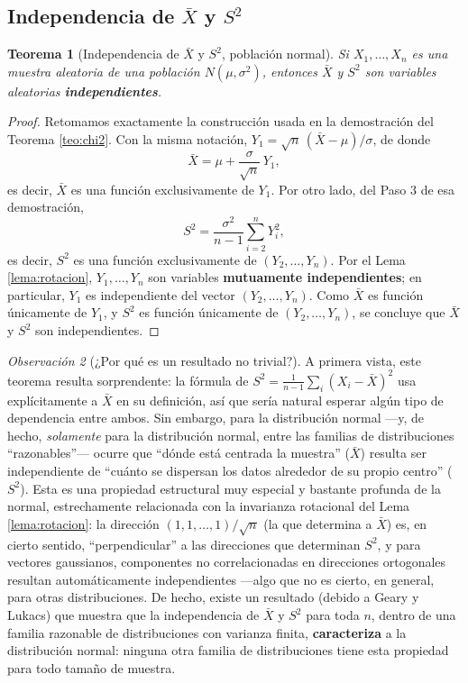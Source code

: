 \documentclass[11pt,a4paper]{article}
\theoremstyle{plain}
\newtheorem{teorema}{Teorema}[section]
\theoremstyle{definition}
\theoremstyle{remark}
\newtheorem{observacion}[teorema]{Observación}
\begin{document}
\subsection{Independencia de $\bar X$ y $S^2$}

\begin{teorema}[Independencia de $\bar X$ y $S^2$, población normal]
\label{teo:independencia}
Si $X_1,\dots,X_n$ es una muestra aleatoria de una población $N(\mu,\sigma^2)$, entonces $\bar X$ y $S^2$ son variables aleatorias \textbf{independientes}.
\end{teorema}

\begin{proof}
Retomamos exactamente la construcción usada en la demostración del Teorema \ref{teo:chi2}. Con la misma notación, $Y_1 = \sqrt n\,(\bar X-\mu)/\sigma$, de donde
$$\bar X = \mu + \frac{\sigma}{\sqrt n}\, Y_1,$$
es decir, $\bar X$ es una función exclusivamente de $Y_1$. Por otro lado, del Paso 3 de esa demostración,
$$S^2 = \frac{\sigma^2}{n-1}\sum_{i=2}^n Y_i^2,$$
es decir, $S^2$ es una función exclusivamente de $(Y_2,\dots,Y_n)$. Por el Lema \ref{lema:rotacion}, $Y_1,\dots,Y_n$ son variables \textbf{mutuamente independientes}; en particular, $Y_1$ es independiente del vector $(Y_2,\dots,Y_n)$. Como $\bar X$ es función únicamente de $Y_1$, y $S^2$ es función únicamente de $(Y_2,\dots,Y_n)$, se concluye que $\bar X$ y $S^2$ son independientes. \qedhere
\end{proof}

\begin{observacion}[¿Por qué es un resultado no trivial?]
A primera vista, este teorema resulta sorprendente: la fórmula de $S^2=\frac{1}{n-1}\sum_i(X_i-\bar X)^2$ usa explícitamente a $\bar X$ en su definición, así que sería natural esperar algún tipo de dependencia entre ambos. Sin embargo, para la distribución normal —y, de hecho, \emph{solamente} para la distribución normal, entre las familias de distribuciones ``razonables''— ocurre que ``dónde está centrada la muestra'' ($\bar X$) resulta ser independiente de ``cuánto se dispersan los datos alrededor de su propio centro'' ($S^2$). Esta es una propiedad estructural muy especial y bastante profunda de la normal, estrechamente relacionada con la invarianza rotacional del Lema \ref{lema:rotacion}: la dirección $(1,1,\dots,1)/\sqrt n$ (la que determina a $\bar X$) es, en cierto sentido, ``perpendicular'' a las direcciones que determinan $S^2$, y para vectores gaussianos, componentes no correlacionadas en direcciones ortogonales resultan automáticamente independientes —algo que no es cierto, en general, para otras distribuciones. De hecho, existe un resultado (debido a Geary y Lukacs) que muestra que la independencia de $\bar X$ y $S^2$ para toda $n$, dentro de una familia razonable de distribuciones con varianza finita, \textbf{caracteriza} a la distribución normal: ninguna otra familia de distribuciones tiene esta propiedad para todo tamaño de muestra.
\end{observacion}
\end{document}
